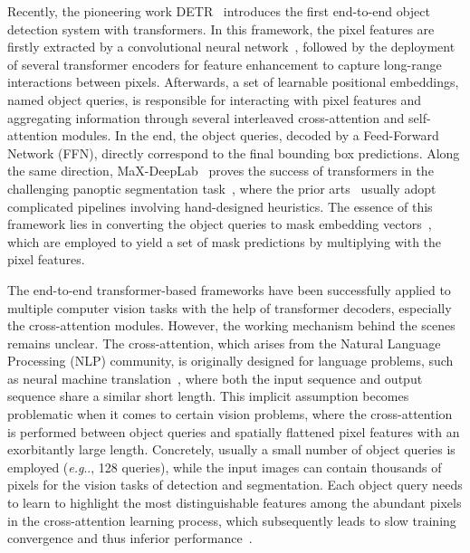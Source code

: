 \documentclass[runningheads]{llncs}
\makeatletter
\DeclareRobustCommand\onedot{\futurelet\@let@token\@onedot}
\def\@onedot{\ifx\@let@token.\else.\null\fi\xspace}
\def\eg{\emph{e.g}\onedot} \def\Eg{\emph{E.g}\onedot}
\makeatother
\begin{document}
Recently, the pioneering work DETR~\cite{carion2020end} introduces the first end-to-end object detection system with transformers.
In this framework, the pixel features are firstly extracted by a convolutional neural network~\cite{lecun1998gradient}, followed by the deployment of several transformer encoders for feature enhancement to capture long-range interactions between pixels.
Afterwards, a set of learnable positional embeddings, named object queries, is responsible for interacting with pixel features and aggregating information through several interleaved cross-attention and self-attention modules.
In the end, the object queries, decoded by a Feed-Forward Network (FFN), directly correspond to the final bounding box predictions.
Along the same direction, MaX-DeepLab~\cite{wang2021max} proves the success of transformers in the challenging panoptic segmentation task~\cite{kirillov2018panoptic}, where the prior arts~\cite{kirillov2019panoptic,xiong2019upsnet,cheng2019panopticworkshop} usually adopt complicated pipelines involving hand-designed heuristics. The essence of this framework lies in converting the object queries to mask embedding vectors~\cite{jia2016dynamic,tian2020conditional,wang2020solov2}, which are employed to yield a set of mask predictions by multiplying with the pixel features.

The end-to-end transformer-based frameworks have been successfully applied to multiple computer vision tasks with the help of transformer decoders, especially the cross-attention modules. However, the working mechanism behind the scenes remains unclear. The cross-attention, which arises from the Natural Language Processing (NLP) community, is originally designed for language problems, such as neural machine translation~\cite{sutskever2014sequence,bahdanau2014neural}, where both the input sequence and output sequence share a similar short length. This implicit assumption becomes problematic when it comes to certain vision problems, where the cross-attention is performed between object queries and spatially flattened pixel features with an exorbitantly large length.
Concretely, usually a small number of object queries is employed (\eg, 128 queries), while the input images can contain thousands of pixels for the vision tasks of detection and segmentation. Each object query needs to learn to highlight the most distinguishable features among the abundant pixels in the cross-attention learning process, which subsequently leads to slow training convergence and thus inferior performance~\cite{zhu2020deformable,gao2021fast}.
\end{document}
